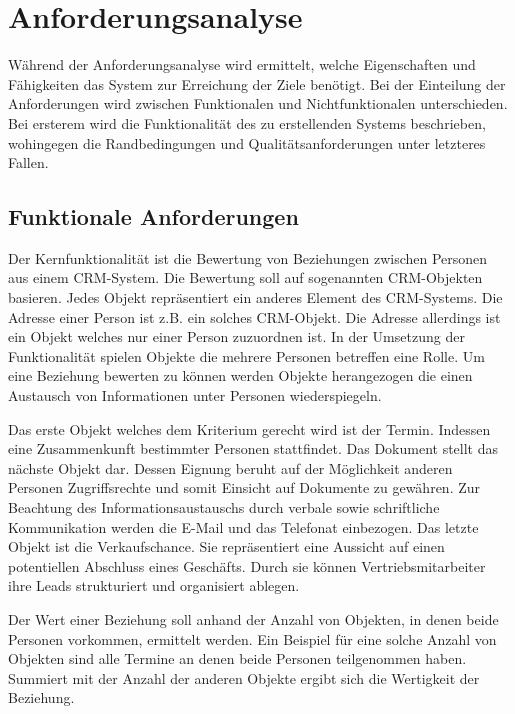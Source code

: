 \section{Anforderungsanalyse}
\label{ch:Systemanalyse:sec:Anforderungsanalyse}

Während der Anforderungsanalyse wird ermittelt, welche Eigenschaften und Fähigkeiten das System zur Erreichung der Ziele benötigt. Bei der Einteilung der Anforderungen wird zwischen Funktionalen und Nichtfunktionalen unterschieden. Bei ersterem wird die Funktionalität des zu erstellenden Systems beschrieben, wohingegen die Randbedingungen und Qualitätsanforderungen unter letzteres Fallen. 

\subsection{Funktionale Anforderungen}

Der Kernfunktionalität ist die Bewertung von Beziehungen zwischen Personen aus einem CRM-System. Die Bewertung soll auf sogenannten CRM-Objekten basieren. Jedes Objekt repräsentiert ein anderes Element des CRM-Systems. Die Adresse einer Person ist z.B. ein solches CRM-Objekt. Die Adresse allerdings ist ein Objekt welches nur einer Person zuzuordnen ist. In der Umsetzung der Funktionalität spielen Objekte die mehrere Personen betreffen eine Rolle. Um eine Beziehung bewerten zu können werden Objekte herangezogen die einen Austausch von Informationen unter Personen wiederspiegeln.
 
Das erste Objekt welches dem Kriterium gerecht wird ist der Termin. Indessen eine Zusammenkunft bestimmter Personen stattfindet. Das Dokument stellt das nächste Objekt dar. Dessen Eignung beruht auf der Möglichkeit anderen Personen Zugriffsrechte und somit Einsicht auf Dokumente zu gewähren. Zur Beachtung des Informationsaustauschs durch verbale sowie schriftliche Kommunikation werden die E-Mail und das Telefonat einbezogen. Das letzte Objekt ist die Verkaufschance. Sie repräsentiert eine Aussicht auf einen potentiellen Abschluss eines Geschäfts. Durch sie können Vertriebsmitarbeiter ihre Leads strukturiert und organisiert ablegen.

Der Wert einer Beziehung soll anhand der Anzahl von Objekten, in denen beide Personen vorkommen, ermittelt werden. Ein Beispiel für eine solche Anzahl von Objekten sind alle Termine an denen beide Personen teilgenommen haben. Summiert mit der Anzahl der anderen Objekte ergibt sich die Wertigkeit der Beziehung. 

